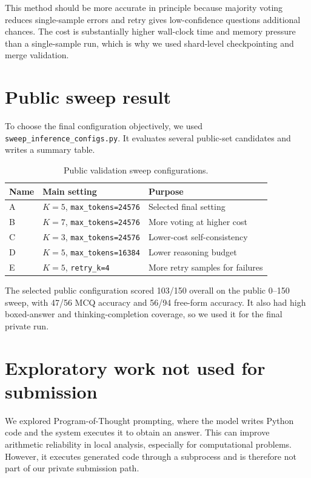 \documentclass{article}
\begin{document}
This method should be more accurate in principle because majority voting reduces single-sample errors and retry gives low-confidence questions additional chances. The cost is substantially higher wall-clock time and memory pressure than a single-sample run, which is why we used shard-level checkpointing and merge validation.

\section{Public sweep result}

To choose the final configuration objectively, we used \texttt{sweep\_inference\_configs.py}. It evaluates several public-set candidates and writes a summary table.

\begin{table}[h]
\centering
\caption{Public validation sweep configurations.}
\label{tab:sweep}
\begin{tabular}{lll}
\toprule
Name & Main setting & Purpose \\
\midrule
A & $K=5$, \texttt{max\_tokens=24576} & Selected final setting \\
B & $K=7$, \texttt{max\_tokens=24576} & More voting at higher cost \\
C & $K=3$, \texttt{max\_tokens=24576} & Lower-cost self-consistency \\
D & $K=5$, \texttt{max\_tokens=16384} & Lower reasoning budget \\
E & $K=5$, \texttt{retry\_k=4} & More retry samples for failures \\
\bottomrule
\end{tabular}
\end{table}

The selected public configuration scored 103/150 overall on the public 0--150 sweep, with 47/56 MCQ accuracy and 56/94 free-form accuracy. It also had high boxed-answer and thinking-completion coverage, so we used it for the final private run.

\section{Exploratory work not used for submission}

We explored Program-of-Thought prompting, where the model writes Python code and the system executes it to obtain an answer. This can improve arithmetic reliability in local analysis, especially for computational problems. However, it executes generated code through a subprocess and is therefore not part of our private submission path.
\end{document}
